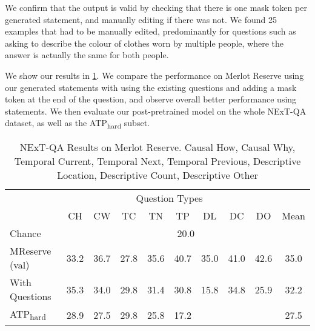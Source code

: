 We confirm that the output is valid by checking that there is one mask token
per generated statement, and manually editing if there was not. We found 25
examples that had to be manually edited, predominantly for questions such as
asking to describe the colour of clothes worn by multiple people, where the
answer is actually the same for both people.

We show our results in \cref{tab:nextqa}. We compare the performance on Merlot Reserve
using our generated statements with using the existing questions and adding a mask
token at the end of the question, and observe overall better performance
using statements. We then evaluate our post-pretrained model on the whole NExT-QA
dataset, as well as the ATP\textsubscript{hard} subset.

\begin{table}[t]
	\centering
	\caption{NExT-QA Results on Merlot Reserve. Causal How, Causal Why,
	Temporal Current, Temporal Next, Temporal Previous, Descriptive Location,
	Descriptive Count, Descriptive Other}
	\label{tab:nextqa}
	\begin{tabular}{lccccccccc}
		\toprule
		\multicolumn{1}{c}{}  & \multicolumn{8}{c}{Question Types} & \multicolumn{1}{c}{}   \\
                                      \cmidrule(){2-9}
							  &  CH  &  CW  &  TC  &  TN  &  TP  &  DL  &  DC  &  DO  & Mean \\
		\midrule
		Chance				  & \multicolumn{9}{c}{20.0} \\
		\midrule
		MReserve (val)        & 33.2 & 36.7 & 27.8 & 35.6 & 40.7 & 35.0 & 41.0 & 42.6 & 35.0 \\
		With Questions		  & 35.3 & 34.0 & 29.8 & 31.4 & 30.8 & 15.8 & 34.8 & 25.9 & 32.2 \\
		\midrule
		ATP\textsubscript{hard}	&	28.9 & 27.5 & 29.8 & 25.8 &	17.2 &  	&      &      & 27.5 \\
		\midrule
		\bottomrule
	\end{tabular}
\end{table}

